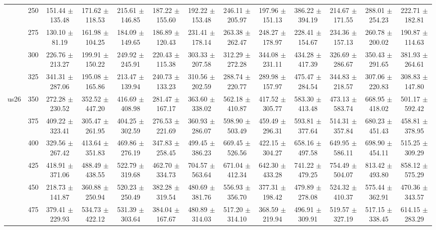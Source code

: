 \begin{table}[h]
{\begin{tabular}{
        ccccccccccccc}
 & 250& 151.44 $\pm$ 135.48& 171.62 $\pm$ 118.53& 215.61 $\pm$ 146.85& 187.22 $\pm$ 155.60& 192.22 $\pm$ 153.48& 246.11 $\pm$ 205.97& 197.96 $\pm$ 151.13& 386.22 $\pm$ 394.19& 214.67 $\pm$ 171.55& 288.01 $\pm$ 254.23& 222.71 $\pm$ 182.81 \\ 
 & 275& 130.10 $\pm$ 81.19& 161.98 $\pm$ 104.25& 184.09 $\pm$ 149.65& 186.89 $\pm$ 120.43& 231.41 $\pm$ 178.14& 263.38 $\pm$ 262.47& 248.27 $\pm$ 178.97& 228.41 $\pm$ 154.67& 234.36 $\pm$ 157.13& 260.78 $\pm$ 200.02& 190.87 $\pm$ 114.63 \\ 
 & 300& 226.76 $\pm$ 213.27& 199.91 $\pm$ 150.22& 249.92 $\pm$ 245.91& 220.43 $\pm$ 115.38& 303.33 $\pm$ 207.58& 312.29 $\pm$ 272.28& 344.08 $\pm$ 231.11& 434.28 $\pm$ 417.39& 326.69 $\pm$ 286.67& 350.43 $\pm$ 291.65& 381.93 $\pm$ 264.61 \\ 
 & 325& 341.31 $\pm$ 287.06& 195.08 $\pm$ 165.86& 213.47 $\pm$ 139.94& 240.73 $\pm$ 133.23& 310.56 $\pm$ 202.59& 288.74 $\pm$ 220.77& 289.98 $\pm$ 157.97& 475.47 $\pm$ 284.54& 344.83 $\pm$ 218.57& 307.06 $\pm$ 220.83& 308.83 $\pm$ 147.80 \\ 
\multirow{4}{*}{us26}& 350& 272.28 $\pm$ 230.52& 352.52 $\pm$ 447.20& 416.69 $\pm$ 408.98& 281.47 $\pm$ 167.17& 363.60 $\pm$ 338.02& 562.18 $\pm$ 410.87& 417.52 $\pm$ 305.77& 583.30 $\pm$ 413.48& 473.13 $\pm$ 583.74& 668.95 $\pm$ 418.02& 501.17 $\pm$ 592.42 \\ 
 & 375& 409.22 $\pm$ 323.41& 305.47 $\pm$ 261.95& 404.25 $\pm$ 302.59& 276.53 $\pm$ 221.69& 360.93 $\pm$ 286.07& 598.90 $\pm$ 503.49& 459.49 $\pm$ 296.31& 593.81 $\pm$ 377.64& 514.31 $\pm$ 357.84& 680.23 $\pm$ 451.43& 458.81 $\pm$ 378.95 \\ 
 & 400& 329.56 $\pm$ 267.42& 413.64 $\pm$ 351.83& 469.86 $\pm$ 276.19& 347.83 $\pm$ 258.45& 499.45 $\pm$ 386.23& 669.45 $\pm$ 526.56& 422.15 $\pm$ 304.27& 658.16 $\pm$ 497.58& 649.95 $\pm$ 586.11& 698.90 $\pm$ 454.11& 515.25 $\pm$ 309.29 \\ 
 & 425& 418.91 $\pm$ 371.06& 488.49 $\pm$ 438.55& 522.79 $\pm$ 319.68& 462.70 $\pm$ 334.73& 704.57 $\pm$ 563.64& 671.04 $\pm$ 412.34& 642.30 $\pm$ 433.28& 741.22 $\pm$ 479.25& 754.49 $\pm$ 504.07& 813.42 $\pm$ 493.80& 858.12 $\pm$ 575.29 \\ 
 & 450& 218.73 $\pm$ 141.87& 360.88 $\pm$ 250.94& 520.23 $\pm$ 250.49& 382.28 $\pm$ 319.54& 480.69 $\pm$ 381.76& 556.93 $\pm$ 356.70& 377.31 $\pm$ 198.42& 479.89 $\pm$ 278.08& 524.32 $\pm$ 410.37& 575.44 $\pm$ 362.91& 470.36 $\pm$ 343.57 \\ 
 & 475& 379.41 $\pm$ 229.93& 534.73 $\pm$ 422.12& 531.39 $\pm$ 303.64& 384.04 $\pm$ 167.67& 480.89 $\pm$ 314.03& 517.20 $\pm$ 314.10& 368.59 $\pm$ 219.94& 496.91 $\pm$ 309.91& 519.57 $\pm$ 327.19& 517.15 $\pm$ 338.45& 614.15 $\pm$ 283.29 \\ 

\end{tabular}}
\end{table}
